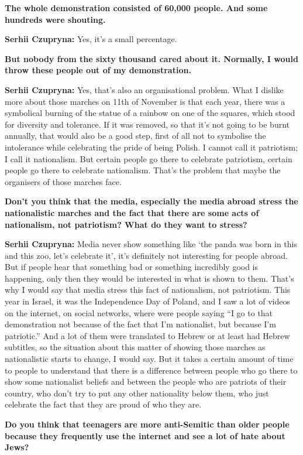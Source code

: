 \textbf{The whole demonstration consisted of 60,000 people. And some hundreds were shouting.}\par 
\textbf{Serhii Czupryna:} Yes, it’s a small percentage. \par
\textbf{But nobody from the sixty thousand cared about it. Normally, I would throw these people out of my demonstration.} \par 
\textbf{Serhii Czupryna:} Yes, that’s also an organisational problem. What I dislike more about those marches on 11th of November is that each year, there was a symbolical burning of the statue of a rainbow on one of the squares, which stood for diversity and tolerance. If it was removed, so that it’s not going to be burnt annually, that would also be a good step, first of all not to symbolise the intolerance while celebrating the pride of being Polish. I cannot call it patriotism; I call it nationalism. But certain people go there to celebrate patriotism, certain people go there to celebrate nationalism. That’s the problem that maybe the organisers of those marches face.\par
\textbf{Don’t you think that the media, especially the media abroad stress the nationalistic marches and the fact that there are some acts of nationalism, not patriotism? What do they want to stress?}\par 
\textbf{Serhii Czupryna:} Media never show something like ‘the panda was born in this and this zoo, let’s celebrate it’, it’s definitely not interesting for people abroad. But if people hear that something bad or something incredibly good is happening, only then they would be interested in what is shown to them. That’s why I would say that media stress this fact of nationalism, not patriotism. This year in Israel, it was the Independence Day of Poland, and I saw a lot of videos on the internet, on social networks, where were people saying “I go to that demonstration not because of the fact that I’m nationalist, but because I’m patriotic.” And a lot of them were translated to Hebrew or at least had Hebrew subtitles, so the situation about this matter of showing those marches as nationalistic starts to change, I would say. But it takes a certain amount of time to people to understand that there is a difference between people who go there to show some nationalist beliefs and between the people who are patriots of their country, who don’t try to put any other nationality below them, who just celebrate the fact that they are proud of who they are.\par
\textbf{Do you think that teenagers are more anti-Semitic than older people because they frequently use the internet and see a lot of hate about Jews? }\par
